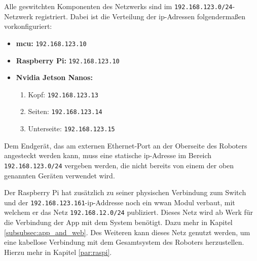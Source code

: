 Alle geswitchten Komponenten des Netzwerks sind im \texttt{192.168.123.0/24}-Netzwerk registriert.
Dabei ist die Verteilung der \gls{ip}-Adressen folgendermaßen vorkonfiguriert:
\begin{itemize}
    \item \textbf{\gls{mcu}:} \texttt{192.168.123.10}
    \item \textbf{Raspberry Pi:} \texttt{192.168.123.10}
    \item \textbf{Nvidia Jetson Nanos:}
    \begin{enumerate}
        \item Kopf: \texttt{192.168.123.13}
        \item Seiten: \texttt{192.168.123.14}
        \item Unterseite: \texttt{192.168.123.15}
    \end{enumerate}
\end{itemize}
Dem Endgerät, das am externen Ethernet-Port an der Oberseite des Roboters angesteckt werden kann,
muss eine statische \gls{ip}-Adresse im Bereich \texttt{192.168.123.0/24} vergeben werden, die nicht bereits von einem der oben genannten
Geräten verwendet wird.

Der Raspberry Pi hat zusätzlich zu seiner physischen Verbindung zum Switch und der \texttt{192.168.123.161}-\gls{ip}-Addresse
noch ein \gls{wwan} Modul verbaut, mit welchem er das Netz \texttt{192.168.12.0/24} publiziert.
Dieses Netz wird ab Werk für die Verbindung der App mit dem System benötigt.
Dazu mehr in Kapitel \ref{subsubsec:app_and_web}.
Des Weiteren kann dieses Netz genutzt werden, um eine kabellose Verbindung mit dem Gesamtsystem
des Roboters herzustellen.
Hierzu mehr in Kapitel \ref{par:raspi}.


